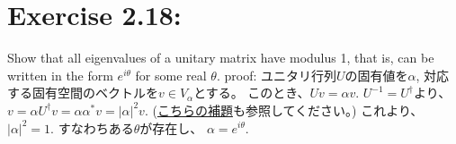 \section{\Large Exercise 2.18:}
Show that all eigenvalues of a unitary matrix have modulus 1,
that is, can be written in the form $e^{i\theta}$ for some real $\theta$.
\newline
{\large proof:}
ユニタリ行列$U$の固有値を$\alpha$, 対応する固有空間のベクトルを$v \in V_\alpha$とする。
このとき、$Uv = \alpha v$.
$U^{-1} = U^\dagger$より、$v = \alpha U^\dagger v = \alpha \alpha^* v = |\alpha|^2 v.$ 
(\hyperlink{hodai.ex2.17}{こちらの補題}も参照してください。)
これより、$|\alpha|^2 = 1.$
すなわちある$\theta$が存在し、
$\alpha = e^{i\theta}.$
